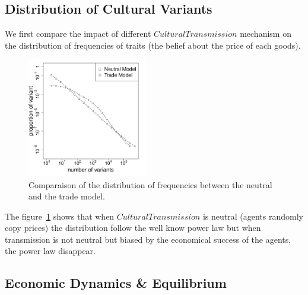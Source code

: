 \documentclass[a1paper,landscape,showframe,fontscale=.42]{baposter}
\begin{document}
\begin{poster}
{\begin{multicols}{2}
\subsection*{Distribution of Cultural Variants}
We first compare the impact of different $CulturalTransmission$ mechanism on the distribution of frequencies of traits (the belief about the price of each goods). 
\begin{figure}[H]
	\centering
	\setlength{\columnseprule}{0pt}
	\begin{multicols}{2}
		\includegraphics[width=5.2cm]{img/2SetupDistribA.pdf} 
		\caption{Comparaison of the distribution of frequencies between the neutral and the trade model.}
		\label{fig:2setDi}
	\end{multicols}
\end{figure}
\vspace{-.8cm}
The figure~\ref{fig:2setDi} shows that when $CulturalTransmission$ is neutral (agents randomly copy prices) the distribution follow the well know power law \cite{bentley_random_2004} but when transmission is not neutral but biased by the economical success of the agents, the power law disappear.

\subsection*{Economic Dynamics \& Equilibrium}




\end{multicols}}
\end{poster}
\end{document}
